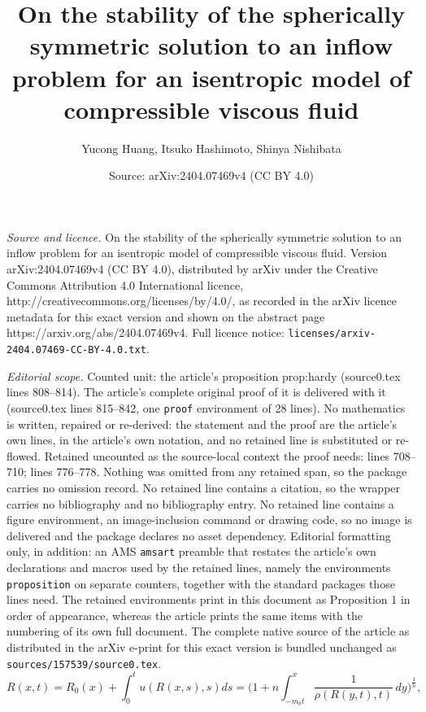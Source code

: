 \documentclass[10pt,a4paper]{amsart}
\title{On the stability of the spherically symmetric solution to an inflow problem for an isentropic model of compressible viscous fluid}
\author{Yucong Huang, Itsuko Hashimoto, Shinya Nishibata}
\date{Source: arXiv:2404.07469v4 (CC BY 4.0)}
\begin{document}
\maketitle

\noindent\emph{Source and licence.} On the stability of the spherically symmetric solution to an inflow problem for an isentropic model of compressible viscous fluid. Version arXiv:2404.07469v4 (CC BY 4.0), distributed by arXiv under the Creative Commons Attribution 4.0 International licence, http://creativecommons.org/licenses/by/4.0/, as recorded in the arXiv licence metadata for this exact version and shown on the abstract page https://arxiv.org/abs/2404.07469v4. Full licence notice: \texttt{licenses/arxiv-2404.07469-CC-BY-4.0.txt}.\par\smallskip

\noindent\textit{Editorial scope.} Counted unit: the article's proposition prop:hardy (source0.tex lines 808--814). The article's complete original proof of it is delivered with it (source0.tex lines 815--842, one \texttt{proof} environment of 28 lines). No mathematics is written, repaired or re-derived: the statement and the proof are the article's own lines, in the article's own notation, and no retained line is substituted or re-flowed.  Retained uncounted as the source-local context the proof needs: lines 708--710; lines 776--778.  Nothing was omitted from any retained span, so the package carries no omission record.  No retained line contains a citation, so the wrapper carries no bibliography and no bibliography entry.  No retained line contains a figure environment, an image-inclusion command or drawing code, so no image is delivered and the package declares no asset dependency.  Editorial formatting only, in addition: an AMS \texttt{amsart} preamble that restates the article's own declarations and macros used by the retained lines, namely the environments \texttt{proposition} on separate counters, together with the standard packages those lines need.  The retained environments print in this document as Proposition 1 in order of appearance, whereas the article prints the same items with the numbering of its own full document.  The complete native source of the article as distributed in the arXiv e-print for this exact version is bundled unchanged as \texttt{sources/157539/source0.tex}.
\begin{equation}\label{R}
R(x,t)= R_0(x) + \int_{0}^{t} u(R(x,s),s)d s = \Big(1+n\int_{-m_b t}^{x} \dfrac{1}{\rho(R(y,t),t)}\,d y\Big)^{\frac{1}{n}},
\end{equation} 
\end{document}
